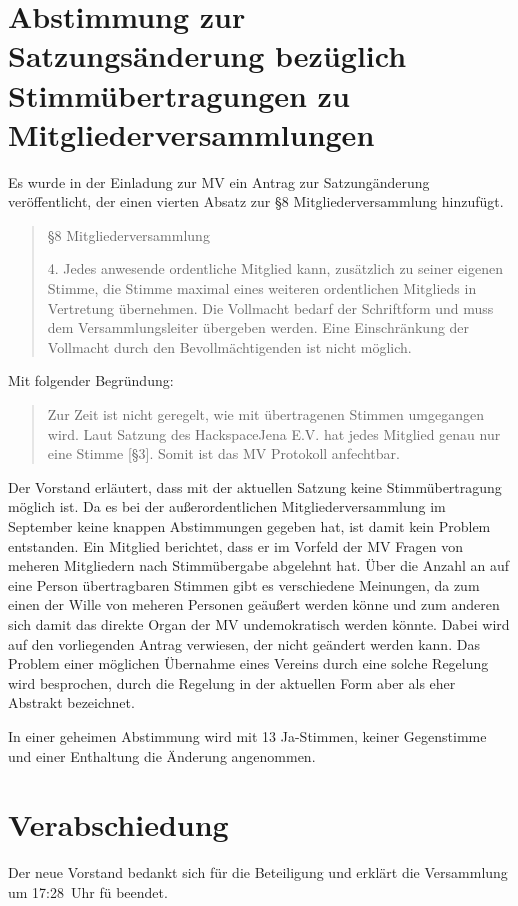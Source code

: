 \documentclass[DIV=calc,parksip=half*]{scrartcl}
\begin{document}
\section{Abstimmung zur Satzungsänderung bezüglich Stimmübertragungen zu Mitgliederversammlungen}
Es wurde in der Einladung zur MV ein Antrag zur Satzungänderung veröffentlicht, der einen vierten Absatz zur §8 Mitgliederversammlung hinzufügt.

\begin{quote}
§8 Mitgliederversammlung

4. Jedes anwesende ordentliche Mitglied kann, zusätzlich zu seiner eigenen Stimme, die Stimme maximal eines weiteren ordentlichen Mitglieds in Vertretung übernehmen.
Die Vollmacht bedarf der Schriftform und muss dem Versammlungsleiter übergeben werden.
Eine Einschränkung der Vollmacht durch den Bevollmächtigenden ist nicht möglich.
\end{quote}

Mit folgender Begründung: 
\begin{quote}
Zur Zeit ist nicht geregelt, wie mit übertragenen Stimmen umgegangen wird. Laut Satzung des HackspaceJena E.V. hat jedes Mitglied genau nur eine Stimme [§3]. Somit ist das MV Protokoll anfechtbar.
\end{quote}

Der Vorstand erläutert, dass mit der aktuellen Satzung keine Stimmübertragung möglich ist. Da es bei der außerordentlichen Mitgliederversammlung im September keine knappen Abstimmungen gegeben hat, ist damit kein Problem entstanden. Ein Mitglied berichtet, dass er im Vorfeld der MV Fragen von meheren Mitgliedern nach Stimmübergabe abgelehnt hat. Über die Anzahl an auf eine Person übertragbaren Stimmen gibt es verschiedene Meinungen, da zum einen der Wille von meheren Personen geäußert werden könne und zum anderen sich damit das direkte Organ der MV undemokratisch werden könnte. Dabei wird auf den vorliegenden Antrag verwiesen, der nicht geändert werden kann. Das Problem einer möglichen Übernahme eines Vereins durch eine solche Regelung wird besprochen, durch die Regelung in der aktuellen Form aber als eher Abstrakt bezeichnet.

In einer geheimen Abstimmung wird mit 13 Ja-Stimmen, keiner Gegenstimme und einer Enthaltung die Änderung angenommen.


\section{Verabschiedung}
Der neue Vorstand bedankt sich für die Beteiligung und erklärt die Versammlung um 17:28~Uhr fü  beendet.
\end{document}
